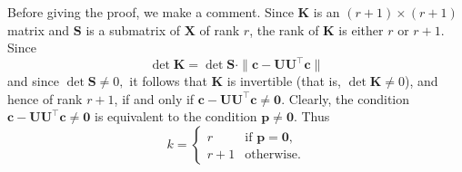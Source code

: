 \documentclass[11pt,a4paper]{article}
\theoremstyle{break}
\numberwithin{dummy}{section}
\theoremstyle{plain}
\theoremstyle{plain}
\theoremstyle{plain}
\theoremstyle{plain}
\theoremstyle{plain}
\theoremstyle{MyNonumberplain}
\DeclareMathOperator*{\rk}{rank}
\DeclareMathOperator{\col}{Col}
\newcommand{\0}{\M{0}}
\newcommand{\M}[1]{\mathbf{#1}}
\newcommand{\T}{\top}
\newcommand{\ve}[1]{\mathbf{#1}}
\begin{document}
Before giving the proof, we make a comment. Since $\M{K}$ is an $(r+1) \times (r+1)$ matrix and $\M{S}$ is a submatrix of $\M{X}$ of rank $r$, the rank of $\M{K}$ is either $r$ or $r+1$. Since
\begin{displaymath}
  \det \M{K} = \det \M{S} \cdot 
  \| \ve{c} - \M{U} \M{U}^\T \ve{c} \| 
\end{displaymath}
and since
\begin{math}
  \det \M{S} \neq 0,
\end{math}
it follows that $\M{K}$ is invertible (that is, $\det \M{K} \neq 0$), and hence of rank $r+1$, if and only if
\begin{math}
  \ve{c} - \M{U} \M{U}^\T \ve{c} \neq \0.
\end{math}
Clearly, the condition
\begin{math}
  \ve{c} - \M{U} \M{U}^\T \ve{c} \neq \0
\end{math}
is equivalent to the condition
\begin{math}
  \ve{p} \neq \0.
\end{math}
Thus
\begin{equation}
  \label{eq:7}
  k =
  \begin{cases}
    r & \text{if $\ve{p} = \0$},
    \\
    r + 1 & \text{otherwise}.
  \end{cases}
\end{equation}

\end{document}
